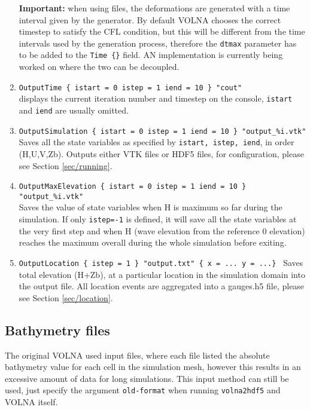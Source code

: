 \documentclass[11pt]{article}
\begin{document}
\begin{enumerate}
\textbf{Important:} when using files, the deformations are generated with a time interval given by the generator. By default VOLNA chooses the correct timestep to satisfy the CFL condition, but this will be different from the time intervals used by the generation process, therefore the \texttt{dtmax} parameter has to be added to the \texttt{Time \{\}} field. AN implementation is currently being worked on where the two can be decoupled.

\item \texttt{OutputTime \{ istart = 0 istep = 1 iend = 10 \} "cout"}\\
displays the current iteration number and timestep on the console, \texttt{istart} and \texttt{iend} are usually omitted.

\item \texttt{OutputSimulation \{ istart = 0 istep = 1 iend = 10 \} "output\_\%i.vtk" } \\
Saves all the state variables as specified by \texttt{istart, istep, iend}, in order (H,U,V,Zb). Outputs either VTK files or HDF5 files, for configuration, please see Section \ref{sec/running}.

\item \texttt{OutputMaxElevation \{ istart = 0 istep = 1 iend = 10 \} "output\_\%i.vtk" } \\
Saves the value of state variables when H is maximum so far during the simulation. If only \texttt{istep=-1} is defined, it will save all the state variables at the very first step and when H (wave elevation from the reference 0 elevation) reaches the maximum overall during the whole simulation before exiting.

\item \texttt{OutputLocation \{ istep = 1 \} "output.txt" \{ x = ... y = ...\} }
Saves total elevation (H+Zb), at a particular location in the simulation domain into the output file. All location events are aggregated into a gauges.h5 file, please see Section \ref{sec/location}.

\end{enumerate}

\subsection{Bathymetry files} \label{sec/bathy}
The original VOLNA used input files, where each file listed the absolute bathymetry value for each cell in the simulation mesh, however this results in an excessive amount of data for long simulations. This input method can still be used, just specify the argument \texttt{old-format} when running \texttt{volna2hdf5} and VOLNA itself.
\end{document}
